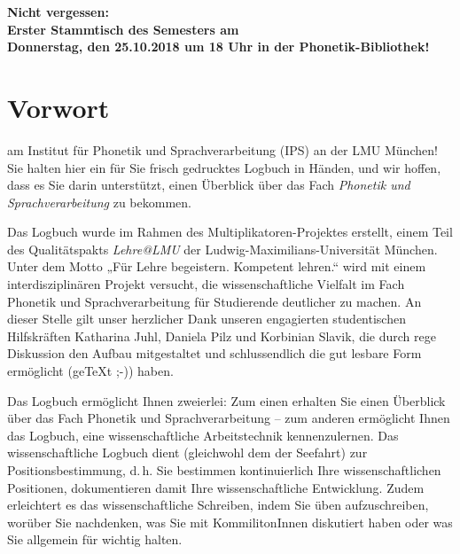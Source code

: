 \documentclass[11pt]{book}
\begin{document}
\begin{titlepage}
\begin{center}
\newpage

\textbf {Nicht vergessen:\\Erster Stammtisch des Semesters am\\Donnerstag, den 25.10.2018 um 18 Uhr in der Phonetik-Bibliothek!}

\end{center}
\end{titlepage}
\thispagestyle{empty}
\tableofcontents

\chapter*{Vorwort}

 am Institut für Phonetik und Sprachverarbeitung (IPS) an der LMU München!
Sie halten hier ein für Sie frisch gedrucktes Logbuch in Händen, und wir hoffen, dass es Sie darin unterstützt, einen Überblick über das Fach \emph{Phonetik und Sprachverarbeitung} zu bekommen.

Das Logbuch wurde im Rahmen des Multiplikatoren-Projektes erstellt, einem Teil des Qualitätspakts \emph{Lehre@LMU} der Ludwig-Maximilians-Universität München. Unter dem Motto „Für Lehre begeistern. Kompetent lehren.“ wird mit einem interdisziplinären Projekt versucht, die wissenschaftliche Vielfalt im Fach Phonetik und Sprachverarbeitung für Studierende deutlicher zu machen. An dieser Stelle gilt unser herzlicher Dank unseren engagierten studentischen Hilfskräften Katharina Juhl, Daniela Pilz und Korbinian Slavik, die durch rege Diskussion den Aufbau mitgestaltet und schlussendlich die gut lesbare Form ermöglicht (ge\TeX{}t ;-)) haben.

Das Logbuch ermöglicht Ihnen zweierlei: Zum einen erhalten Sie einen Überblick über das Fach Phonetik und Sprachverarbeitung – zum anderen ermöglicht Ihnen das Logbuch, eine wissenschaftliche Arbeitstechnik kennenzulernen. Das wissenschaftliche Logbuch dient (gleichwohl dem der Seefahrt) zur Positionsbestimmung, d.\,h. Sie bestimmen kontinuierlich Ihre wissenschaftlichen Positionen, dokumentieren damit Ihre wissenschaftliche Entwicklung. Zudem erleichtert es das wissenschaftliche Schreiben, indem Sie üben aufzuschreiben, worüber Sie nachdenken, was Sie mit KommilitonInnen diskutiert haben oder was Sie allgemein für wichtig halten.
\end{document}
